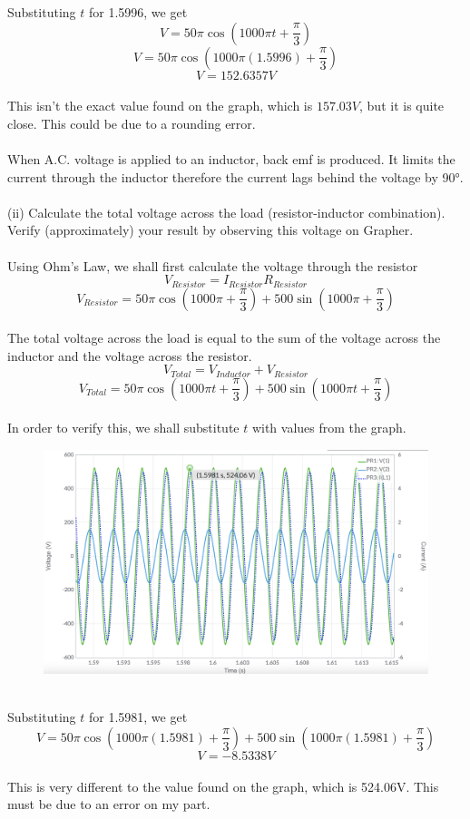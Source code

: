 \documentclass[12pt]{article}
\begin{document}
\noindent Substituting \(t\) for 1.5996, we get\\
\[V = 50 \pi \cos (1000\pi t + \frac{\pi}{3})\]
\[V = 50\pi \cos (1000\pi (1.5996) + \frac{\pi}{3})\]
\[V = 152.6357 V\]\\
This isn't the exact value found on the graph, which is \(157.03V\), but it is quite close. This could be due to a rounding error.\\
\\
When A.C. voltage is applied to an inductor, back emf is produced. It limits the current through the inductor therefore the current lags behind the voltage by 90°.\\
\\
(ii) Calculate the total voltage across the load (resistor-inductor combination). Verify (approximately) your result by observing this voltage on Grapher.\\
\\
Using Ohm's Law, we shall first calculate the voltage through the resistor\\
\[V_{Resistor} = I_{Resistor}R_{Resistor}\]
\[V_{Resistor} = 50\pi \cos (1000\pi + \frac{\pi}{3}) + 500\sin(1000\pi + \frac{\pi}{3})\]\\
The total voltage across the load is equal to the sum of the voltage across the inductor and the voltage across the resistor.\\
\[V_{Total} = V_{Inductor} + V_{Resistor}\]
\[V_{Total} = 50\pi \cos (1000\pi t + \frac{\pi}{3}) + 500\sin (1000\pi t + \frac{\pi}{3})\]\\
In order to verify this, we shall substitute \(t\) with values from the graph.\\
\begin{figure}[!h] 
	\begin{centering}
		\includegraphics[keepaspectratio = true, width = 6in]{q2(ii).png}
	\end{centering}
\end{figure}\\
\noindent Substituting \(t\) for 1.5981, we get\\
\[V = 50\pi \cos(1000\pi (1.5981) + \frac{\pi}{3}) + 500 \sin(1000\pi (1.5981) + \frac{\pi}{3})\]
\[V = -8.5338V\]\\
This is very different to the value found on the graph, which is 524.06V. This must be due to an error on my part.
\end{document}
